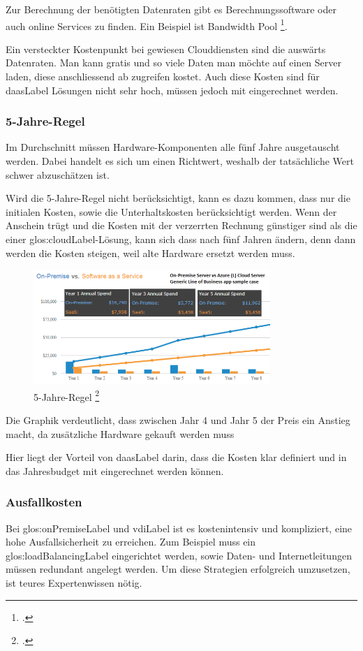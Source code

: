Zur Berechnung der benötigten Datenraten gibt es Berechnungssoftware oder auch online Services zu finden. Ein Beispiel ist Bandwidth Pool \footcite{What_is_Bandwidth_Pool_Bandwidth_Pool}.

Ein versteckter Kostenpunkt bei gewiesen Clouddiensten sind die auswärts Datenraten. Man kann gratis und so viele Daten man möchte auf einen Server laden, diese anschliessend ab zugreifen kostet.
Auch diese Kosten sind für \Gls{daasLabel} Lösungen nicht sehr hoch, müssen jedoch mit eingerechnet werden.

\subsubsection{5-Jahre-Regel}
Im Durchschnitt müssen Hardware-Komponenten alle fünf Jahre ausgetauscht werden. Dabei handelt es sich um einen Richtwert, weshalb der tatsächliche Wert schwer abzuschätzen ist.

Wird die 5-Jahre-Regel nicht berücksichtigt, kann es dazu kommen, dass nur die initialen Kosten, sowie die Unterhaltskosten berücksichtigt werden.
Wenn der Anschein trügt und die Kosten mit der verzerrten Rechnung günstiger sind als die einer \Gls{glos:cloudLabel}-Lösung, kann sich dass nach fünf Jahren ändern, denn dann werden die Kosten steigen, weil alte Hardware ersetzt werden muss.

\begin{figure}[H]
	\includegraphics[width=0.8\textwidth]{images/five-year-rule}
	\caption{5-Jahre-Regel \footcite{Comparing_cloud_vs_on-premise_Six_hidden_costs_people_always_forget_about}}
	\label{fig:fiveYearRuleImage}
\end{figure}
Die Graphik verdeutlicht, dass zwischen Jahr 4 und Jahr 5 der Preis ein Anstieg macht, da zusätzliche Hardware gekauft werden muss

Hier liegt der Vorteil von \Gls{daasLabel} darin, dass die Kosten klar definiert und in das Jahresbudget mit eingerechnet werden können.

\subsubsection{Ausfallkosten}
Bei \gls{glos:onPremiseLabel} und \Gls{vdiLabel} ist es kostenintensiv und kompliziert, eine hohe Ausfallsicherheit zu erreichen. Zum Beispiel muss ein \gls{glos:loadBalancingLabel} eingerichtet werden, sowie Daten- und Internetleitungen müssen redundant angelegt werden. Um diese Strategien erfolgreich umzusetzen, ist teures Expertenwissen nötig.


